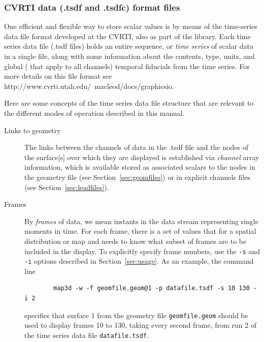\subsubsection{CVRTI data (.tsdf and .tsdfc) format files}
\label{sec:tsdffile} 

One efficient and flexible way to store scalar values is by means of the
time-series data file format developed at the CVRTI, also as part of the
\graphicsio{} library.  Each time series data file (.tsdf files) holds an
entire sequence, or \emph{time series} of scalar data in a single file,
along with some information about the contents, type, units, and global
(\ie{} that apply to all channels) temporal fiducials from the time series.
For more details on this file format see
{http://www.cvrti.utah.edu/~macleod/docs/graphicsio}.

Here are some concepts of the time series data file structure that are
relevant to the different modes of operation described in this manual.
%
\begin{description}
  \item [Links to geometry]  The
        links between the channels of data in the .tsdf file and the nodes
        of the surface[s] over which they are displayed is established via
        {\em channel\/} array information, which is available stored as
        associated scalars to the nodes in the geometry file (see
        Section~\ref{sec:geomfiles}) or in explicit channels files (see
        Section~\ref{sec:leadfiles}).
  \item [Frames]  By {\em frames\/} of data, we mean instants in the data
        stream representing single moments in time.  For each frame, there
        is a set of values that for a spatial distribution or map and
        \map{} needs to know what subset of frames are to be 
        included in the display.  To explicitly specify frame numbers, use
        the \texttt{-s} and \texttt{-i} options described in
        Section~\ref{sec:usage}.  As an example, the command line
\begin{verbatim}
        map3d -w -f geomfile.geom@1 -p datafile.tsdf -s 10 130 -i 2
\end{verbatim}
        specifies that surface 1 from the geometry file {\tt geomfile.geom}
        should be used to display frames 10 to 130, taking every second
        frame, from run 2 of the time series data file {\tt datafile.tsdf}.
\end{description}


